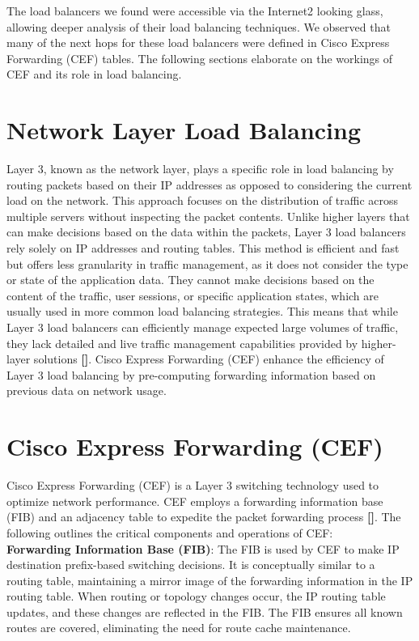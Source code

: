 \documentclass[12pt]{cwru_thesis}
\begin{document}
The load balancers we found were accessible via the Internet2 looking glass, allowing deeper analysis of their load balancing techniques. We observed that many of the next hops for these load balancers were defined in Cisco Express Forwarding (CEF) tables. The following sections elaborate on the workings of CEF and its role in load balancing.

\section{Network Layer Load Balancing}

Layer 3, known as the network layer, plays a specific role in load balancing by routing packets based on their IP addresses as opposed to considering the current load on the network. This approach focuses on the distribution of traffic across multiple servers without inspecting the packet contents. Unlike higher layers that can make decisions based on the data within the packets, Layer 3 load balancers rely solely on IP addresses and routing tables. This method is efficient and fast but offers less granularity in traffic management, as it does not consider the type or state of the application data. They cannot make decisions based on the content of the traffic, user sessions, or specific application states, which are usually used in more common load balancing strategies. This means that while Layer 3 load balancers can efficiently manage expected large volumes of traffic, they lack detailed and live traffic management capabilities provided by higher-layer solutions \textbf{[\cite{zhang}]}.
Cisco Express Forwarding (CEF) enhance the efficiency of Layer 3 load balancing by pre-computing forwarding information based on previous data on network usage.

\section{Cisco Express Forwarding (CEF)}

Cisco Express Forwarding (CEF)  is a Layer 3 switching technology used to optimize network performance. CEF employs a forwarding information base (FIB) and an adjacency table to expedite the packet forwarding process \textbf{[\cite{cisco2017cef}]}. The following outlines the critical components and operations of CEF:\\

\textbf{Forwarding Information Base (FIB)}: The FIB is used by CEF to make IP destination prefix-based switching decisions. It is conceptually similar to a routing table, maintaining a mirror image of the forwarding information in the IP routing table. When routing or topology changes occur, the IP routing table updates, and these changes are reflected in the FIB. The FIB ensures all known routes are covered, eliminating the need for route cache maintenance.
\end{document}
